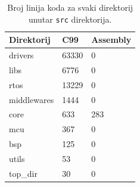 \documentclass[times, utf8, diplomski, numeric]{templates/template}
\begin{document}
{{        \begin{table}[htb]
        \caption{Broj linija koda za svaki direktorij unutar \texttt{src} direktorija.}
        \label{tbl:broj_linija}
        \centering
        \begin{tabular}{lll} 
        \toprule
        Direktorij & C99 & Assembly \\ 
        \midrule
        drivers     &     63330    &   0    \\
        libs        &     6776     &   0    \\
        rtos        &     13229    &   0    \\
        middlewares &     1444     &   0    \\
        core        &     633      &   283  \\
        mcu         &     367      &   0    \\
        bsp         &     125      &   0    \\
        utils       &     53       &   0    \\
        top\_dir    &     30       &   0    \\
        \bottomrule
        \end{tabular}
        \end{table}
    }
}
\end{document}
